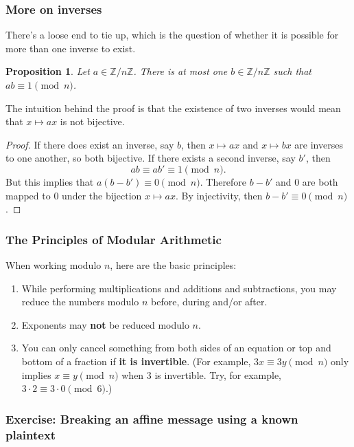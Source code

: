 \documentclass{article}
\theoremstyle{plain}
\newtheorem{proposition}[theorem]{Proposition}
\theoremstyle{definition}
\theoremstyle{remark}
\numberwithin{theorem}{section}
\newcommand{\ZZ}{\mathbb{Z}}
\begin{document}
\subsubsection{More on inverses}

There's a loose end to tie up, which is the question of whether it is possible for more than one inverse to exist.

\begin{proposition}
	Let $a \in \ZZ/n\ZZ$.  There is at most one $b \in \ZZ/n\ZZ$ such that $ab \equiv 1 \pmod n$.
\end{proposition}

The intuition behind the proof is that the existence of two inverses would mean that $x \mapsto ax$ is not bijective.

\begin{proof}
	If there does exist an inverse, say $b$, then $x \mapsto ax$ and $x \mapsto bx$ are inverses to one another, so both bijective.
	If there exists a second inverse, say $b'$, then
	\[
		ab \equiv ab' \equiv 1 \pmod n.
	\]
	But this implies that $a(b-b')\equiv 0 \pmod n$.  Therefore $b-b'$ and $0$ are both mapped to $0$ under the bijection $x \mapsto ax$.  By injectivity, then $b-b' \equiv 0 \pmod n$.
\end{proof}

\subsubsection{The Principles of Modular Arithmetic}
\label{sec:mod-ppls}

When working modulo $n$, here are the basic principles:

\begin{enumerate}
	\item While performing multiplications and additions and subtractions, you may reduce the numbers modulo $n$ before, during and/or after.
	\item Exponents may \textbf{not} be reduced modulo $n$.
	\item You can only cancel something from both sides of an equation or top and bottom of a fraction if \textbf{it is invertible}.  (For example, $3x \equiv 3y \pmod{n}$ only implies $x \equiv y \pmod{n}$ when $3$ is invertible.  Try, for example, $3 \cdot 2 \equiv 3 \cdot 0 \pmod{6}$.)
\end{enumerate}


\subsubsection{Exercise:  Breaking an affine message using a known plaintext}
\end{document}
